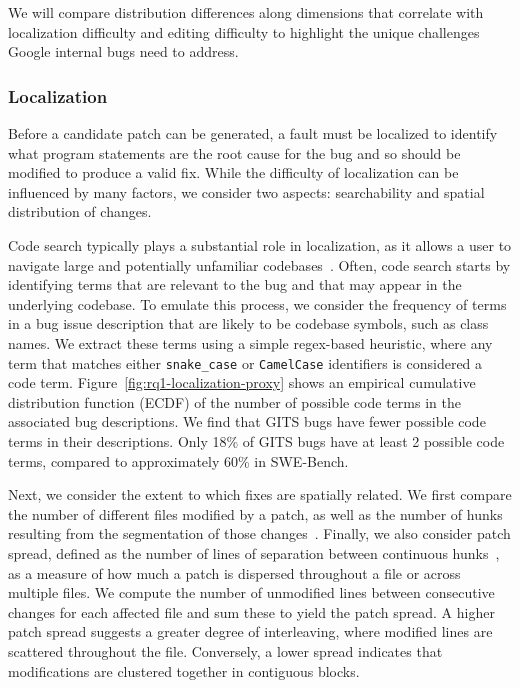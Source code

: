 We will compare distribution differences along dimensions that correlate with localization difficulty and editing difficulty to highlight the unique challenges Google internal bugs need to address. 


\subsubsection{Localization}

Before a candidate patch can be generated, a fault must be localized to identify what program statements are the root cause for the bug and so should be modified to produce a valid fix. While the difficulty of localization can be influenced by many factors, we consider two aspects: searchability and spatial distribution of changes. 

Code search typically plays a substantial role in localization, as it allows a user to navigate large and potentially unfamiliar codebases~\cite{sadowski2015developers}. Often, code search starts by identifying terms that are relevant to the bug and that may appear in the underlying codebase. To emulate this process, we consider the frequency of terms in a bug issue description that are likely to be codebase symbols, such as class names. We extract these terms using a simple regex-based heuristic, where any term that matches either \texttt{snake\_case} or \texttt{CamelCase} identifiers is considered a code term.
Figure~\ref{fig:rq1-localization-proxy} shows an empirical cumulative distribution function (ECDF) of the number of possible code terms in the associated bug descriptions. We find that GITS bugs have fewer possible code terms in their descriptions.
Only 18\% of GITS bugs have at least 2 possible code terms, compared to approximately 60\% in SWE-Bench.

Next, we consider the extent to which fixes are spatially related. We first compare the number of different files modified by a patch, as well as the number of hunks resulting from the segmentation of those changes~\cite{hunks}. Finally, we also consider patch spread, defined as the number of lines of separation between continuous hunks~\cite{sobreira2018dissection}, as a measure of how much a patch is dispersed throughout a file or across multiple files.
We compute the number of unmodified lines between consecutive changes for each affected file and sum these to yield the patch spread. A higher patch spread suggests a greater degree of interleaving, where modified lines are scattered throughout the file. Conversely, a lower spread indicates that modifications are clustered together in contiguous blocks.


